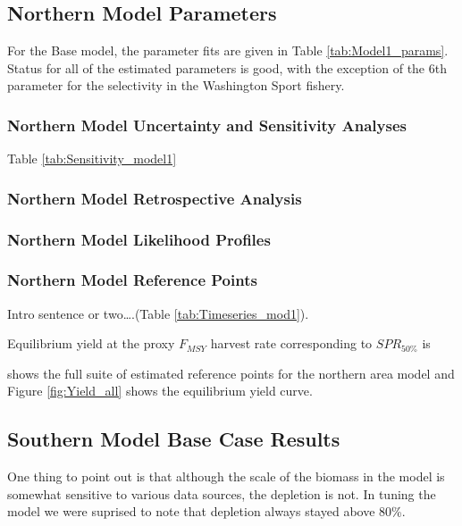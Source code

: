 \documentclass[12pt,]{article}
\begin{document}
\subsection{Northern Model Parameters}\label{northern-model-parameters}

For the Base model, the parameter fits are given in Table
\ref{tab:Model1_params}. Status for all of the estimated parameters is
good, with the exception of the 6th parameter for the selectivity in the
Washington Sport fishery.

\subsubsection{Northern Model Uncertainty and Sensitivity
Analyses}\label{northern-model-uncertainty-and-sensitivity-analyses}

Table \ref{tab:Sensitivity_model1}

\subsubsection{Northern Model Retrospective
Analysis}\label{northern-model-retrospective-analysis}

\subsubsection{Northern Model Likelihood
Profiles}\label{northern-model-likelihood-profiles}

\subsubsection{Northern Model Reference
Points}\label{northern-model-reference-points}

Intro sentence or two\ldots{}.(Table \ref{tab:Timeseries_mod1}).

Equilibrium yield at the proxy \(F_{MSY}\) harvest rate corresponding to
\(SPR_{50\%}\) is

shows the full suite of estimated reference points for the northern area
model and Figure \ref{fig:Yield_all} shows the equilibrium yield curve.

\clearpage

\subsection{Southern Model Base Case
Results}\label{southern-model-base-case-results}

One thing to point out is that although the scale of the biomass in the
model is somewhat sensitive to various data sources, the depletion is
not. In tuning the model we were suprised to note that depletion always
stayed above 80\%.
\end{document}
